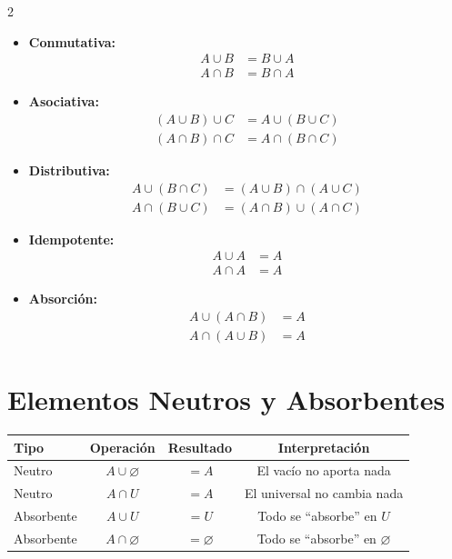 \documentclass[11pt,a4paper]{article}
\begin{document}
\begin{multicols}{2}
\begin{itemize}[leftmargin=*, itemsep=0.8em]
  \item \textbf{Conmutativa:}
    \begin{align*}
      A \cup B &= B \cup A \\
      A \cap B &= B \cap A
    \end{align*}

  \item \textbf{Asociativa:}
    \begin{align*}
      (A \cup B) \cup C &= A \cup (B \cup C) \\
      (A \cap B) \cap C &= A \cap (B \cap C)
    \end{align*}

  \item \textbf{Distributiva:}
    \begin{align*}
      A \cup (B \cap C) &= (A \cup B) \cap (A \cup C) \\
      A \cap (B \cup C) &= (A \cap B) \cup (A \cap C)
    \end{align*}

  \item \textbf{Idempotente:}
    \begin{align*}
      A \cup A &= A \\
      A \cap A &= A
    \end{align*}

  \item \textbf{Absorción:}
    \begin{align*}
      A \cup (A \cap B) &= A \\
      A \cap (A \cup B) &= A
    \end{align*}
\end{itemize}
\end{multicols}

\vspace{1em}

\section{Elementos Neutros y Absorbentes}

\begin{center}
\begin{tabular}{lccc}
\toprule
\textbf{Tipo} & \textbf{Operación} & \textbf{Resultado} & \textbf{Interpretación} \\
\midrule
Neutro & $A \cup \varnothing$ & $= A$ & El vacío no aporta nada \\
Neutro & $A \cap U$ & $= A$ & El universal no cambia nada \\
Absorbente & $A \cup U$ & $= U$ & Todo se ``absorbe'' en $U$ \\
Absorbente & $A \cap \varnothing$ & $= \varnothing$ & Todo se ``absorbe'' en $\varnothing$ \\
\bottomrule
\end{tabular}
\end{center}
\end{document}
